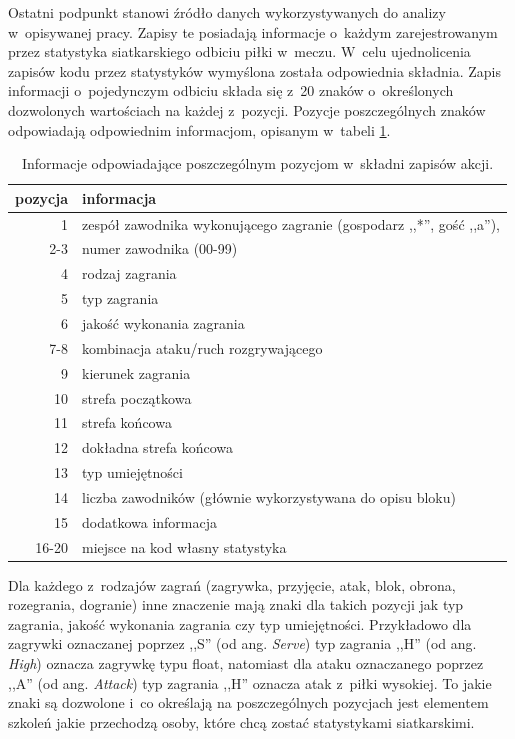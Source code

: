\documentclass[a4paper,twoside,12pt]{book}
\newcommand{\obcy}[1]{\emph{#1}}
\renewcommand{\ang}[1]{{\selectlanguage{british}\obcy{#1}}}
\begin{document}
Ostatni podpunkt stanowi źródło danych wykorzystywanych do analizy w~opisywanej pracy. Zapisy te posiadają informacje o~każdym zarejestrowanym przez statystyka siatkarskiego odbiciu piłki w~meczu. W~celu ujednolicenia zapisów kodu przez statystyków wymyślona została odpowiednia składnia. Zapis informacji o~pojedynczym odbiciu składa się z~20 znaków o~określonych dozwolonych wartościach na każdej z~pozycji. Pozycje poszczególnych znaków odpowiadają odpowiednim informacjom, opisanym w~tabeli \ref{tab:skladnia}.

\begin{table}
\centering
\caption{Informacje odpowiadające poszczególnym pozycjom w~składni zapisów akcji.}
\label{tab:skladnia}
\begin{tabular}{rl}
	\toprule
	pozycja     & informacja \\
	\midrule
	1       &  zespół zawodnika wykonującego zagranie (gospodarz ,,*'', gość ,,a''),  \\
	2-3 &  numer zawodnika (00-99) \\
	4   &  rodzaj zagrania \\
	5  &  typ zagrania \\
	6     &  jakość wykonania zagrania \\
	7-8       &  kombinacja ataku/ruch rozgrywającego \\
	9   &   kierunek zagrania \\
	10   &   strefa początkowa \\
	11  &   strefa końcowa \\
	12  &   dokładna strefa końcowa \\
	13  &   typ umiejętności \\
	14  &   liczba zawodników (głównie wykorzystywana do opisu bloku) \\
	15  &   dodatkowa informacja \\
	16-20  &   miejsce na kod własny statystyka \\
	\bottomrule
\end{tabular}
\end{table}

Dla każdego z~rodzajów zagrań (zagrywka, przyjęcie, atak, blok, obrona, rozegrania, dogranie) inne znaczenie mają znaki dla takich pozycji jak typ zagrania, jakość wykonania zagrania czy typ umiejętności. Przykładowo dla zagrywki oznaczanej poprzez ,,S'' (od ang. \ang{Serve}) typ zagrania ,,H'' (od ang. \ang{High}) oznacza zagrywkę typu float, natomiast dla ataku oznaczanego poprzez ,,A'' (od ang. \ang{Attack}) typ zagrania ,,H'' oznacza atak z~piłki wysokiej. To jakie znaki są dozwolone i~co określają na poszczególnych pozycjach jest elementem szkoleń jakie przechodzą osoby, które chcą zostać statystykami siatkarskimi.
 
\end{document}
